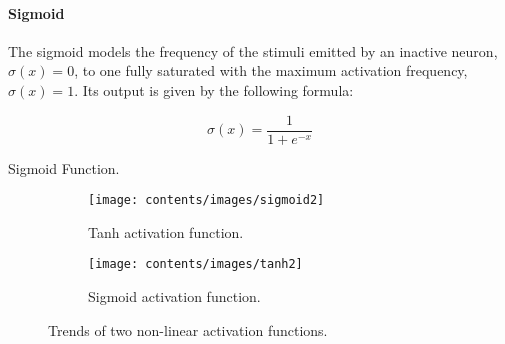 \paragraph*{Sigmoid}
The sigmoid models the frequency of the stimuli emitted by an inactive neuron, 
$\sigma(x)=0$, to one fully saturated with the maximum activation frequency, 
$\sigma(x)=1$. Its  output is given by the following formula:
\begin{Equation}[H]
	\centering
	\begin{equation}
	\sigma(x)= \frac{1}{1 + e^{-x}}
	\end{equation}
	\caption{Sigmoid Function.}
	\label{eq:sigmoid}
\end{Equation}

\begin{figure}[!htb]
	\begin{center}
		\begin{subfigure}[h]{0.495\textwidth}
			\texttt{[image: contents/images/sigmoid2]}
			\caption{Tanh activation function.}
		\end{subfigure}
		\hfill
		\begin{subfigure}[h]{0.495\textwidth}
			\texttt{[image: contents/images/tanh2]}
			\caption{Sigmoid activation function.}
		\end{subfigure}
	\end{center}
	\caption{Trends of two non-linear activation functions.}
	\label{fig:activation}
\end{figure}

%
%
%
%
%
%

